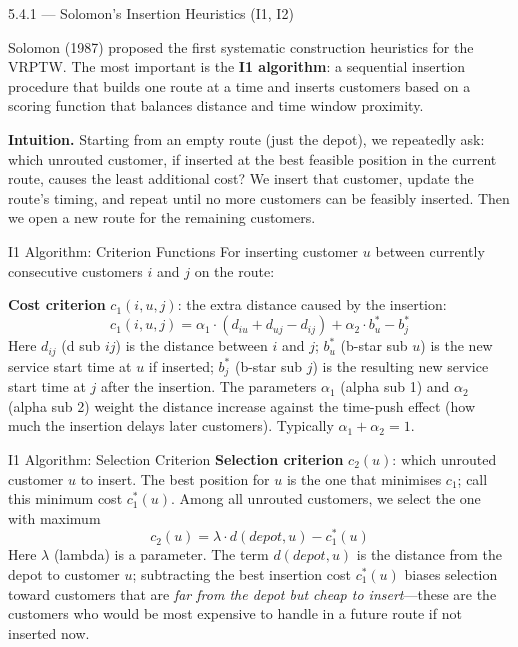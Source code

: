 \documentclass[aspectratio=169,10pt]{beamer}
\begin{document}
\begin{frame}[allowframebreaks]{5.4.1 --- Solomon's Insertion Heuristics (I1, I2)}

Solomon (1987) proposed the first systematic construction heuristics for the VRPTW.
The most important is the \textbf{I1 algorithm}: a sequential insertion procedure
that builds one route at a time and inserts customers based on a scoring function
that balances distance and time window proximity.

\medskip
\textbf{Intuition.}  Starting from an empty route (just the depot), we repeatedly
ask: which unrouted customer, if inserted at the best feasible position in the
current route, causes the least additional cost?  We insert that customer, update
the route's timing, and repeat until no more customers can be feasibly inserted.
Then we open a new route for the remaining customers.

\begin{block}{I1 Algorithm: Criterion Functions}
For inserting customer $u$ between currently consecutive customers $i$ and $j$ on
the route:

\textbf{Cost criterion} $c_1(i, u, j)$: the extra distance caused by the insertion:
\[
  c_1(i, u, j) = \alpha_1 \cdot (d_{iu} + d_{uj} - d_{ij})
              + \alpha_2 \cdot b_u^* - b_j^*
\]
Here $d_{ij}$ (d sub $ij$) is the distance between $i$ and $j$;
$b_u^*$ (b-star sub $u$) is the new service start time at $u$ if inserted;
$b_j^*$ (b-star sub $j$) is the resulting new service start time at $j$ after
the insertion.  The parameters $\alpha_1$ (alpha sub 1) and $\alpha_2$ (alpha sub 2)
weight the distance increase against the time-push effect (how much the insertion
delays later customers).  Typically $\alpha_1 + \alpha_2 = 1$.
\end{block}

\framebreak

\begin{block}{I1 Algorithm: Selection Criterion}
\textbf{Selection criterion} $c_2(u)$: which unrouted customer $u$ to insert.
The best position for $u$ is the one that minimises $c_1$; call this minimum cost
$c_1^*(u)$.  Among all unrouted customers, we select the one with maximum
\[
  c_2(u) = \lambda \cdot d(depot, u) - c_1^*(u)
\]
Here $\lambda$ (lambda) is a parameter.  The term $d(depot, u)$ is the distance
from the depot to customer $u$; subtracting the best insertion cost $c_1^*(u)$
biases selection toward customers that are \emph{far from the depot but cheap to
insert}---these are the customers who would be most expensive to handle in a future
route if not inserted now.
\end{block}


\end{frame}
\end{document}
